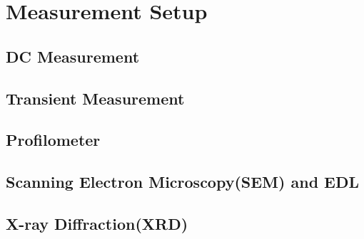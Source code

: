 \chapter{Measurement Setup}
\label{Measurement Setup}
\section{DC Measurement}
\section{Transient Measurement}
\section {Profilometer}
\section{Scanning Electron Microscopy(SEM) and EDL}
\section{X-ray Diffraction(XRD)}